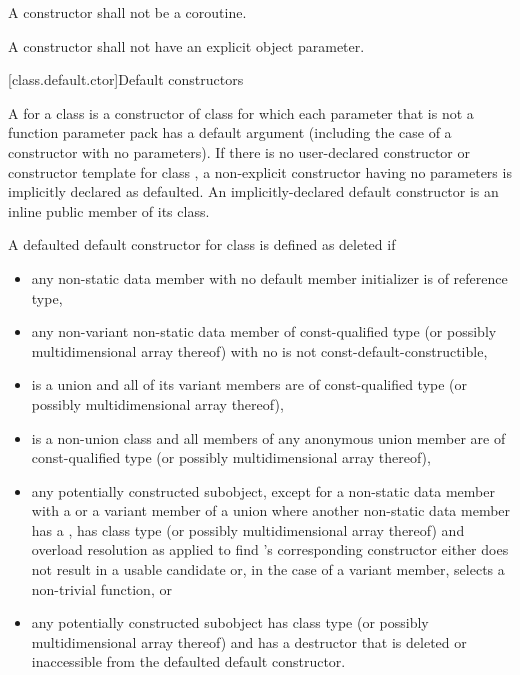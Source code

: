 \pnum
A constructor shall not be a coroutine.

\pnum
A constructor shall not have an explicit object parameter.

[class.default.ctor]{Default constructors}

\pnum
{}%
%
A  for a class 
is a constructor of class 
for which each parameter
that is not a function parameter pack
has a default argument
(including the case of a constructor with no parameters).
%
If there is no user-declared constructor or constructor template for class
,
a non-explicit constructor having no parameters is implicitly declared
as defaulted.
An implicitly-declared default constructor is an
inline public member of its class.

\pnum
A defaulted default constructor for class  is defined as deleted if
\begin{itemize}
\item any non-static data member with no default member initializer is
of reference type,

\item any non-variant non-static data member of const-qualified type
(or possibly multidimensional array thereof)
with no 
is not const-default-constructible,

\item {} is a union and all of its variant members are of const-qualified
type (or possibly multidimensional array thereof),

\item {} is a non-union class and all members of any anonymous union member are
of const-qualified type (or possibly multidimensional array thereof),

\item any potentially constructed subobject, except for a non-static data member
with a 
or a variant member of a union where another non-static data member
has a ,
has class type  (or possibly multidimensional array thereof)
and overload resolution
as applied to find 's corresponding constructor
either does not result in a usable candidate
or, in the case of a variant member, selects a non-trivial function, or

\item any potentially constructed subobject has
class type  (or possibly multidimensional array thereof) and
 has
a destructor that is deleted or inaccessible from the defaulted default
constructor.
\end{itemize}

